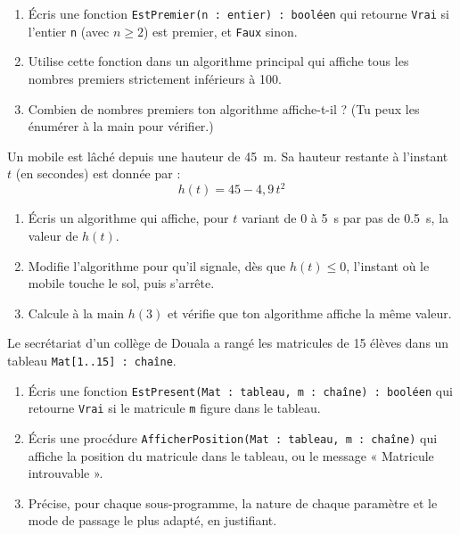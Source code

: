 \documentclass[11pt]{article}
\begin{document}
\begin{exercice}
\begin{enumerate}
  \item Écris une fonction \texttt{EstPremier(n : entier) : booléen} qui retourne \texttt{Vrai} si l'entier \texttt{n} (avec $n \geq 2$) est premier, et \texttt{Faux} sinon.
  \item Utilise cette fonction dans un algorithme principal qui affiche tous les nombres premiers strictement inférieurs à 100.
  \item Combien de nombres premiers ton algorithme affiche-t-il ? (Tu peux les énumérer à la main pour vérifier.)
\end{enumerate}
\end{exercice}

\begin{exercice}
Un mobile est lâché depuis une hauteur de \SI{45}{m}. Sa hauteur restante à l'instant $t$ (en secondes) est donnée par :
\[ h(t) = 45 - 4{,}9\,t^2 \]
\begin{enumerate}
  \item Écris un algorithme qui affiche, pour $t$ variant de 0 à \SI{5}{s} par pas de \SI{0,5}{s}, la valeur de $h(t)$.
  \item Modifie l'algorithme pour qu'il signale, dès que $h(t) \leq 0$, l'instant où le mobile touche le sol, puis s'arrête.
  \item Calcule à la main $h(3)$ et vérifie que ton algorithme affiche la même valeur.
\end{enumerate}
\end{exercice}

\begin{exercice}
Le secrétariat d'un collège de Douala a rangé les matricules de 15 élèves dans un tableau \texttt{Mat[1..15] : chaîne}.
\begin{enumerate}
  \item Écris une fonction \texttt{EstPresent(Mat : tableau, m : chaîne) : booléen} qui retourne \texttt{Vrai} si le matricule \texttt{m} figure dans le tableau.
  \item Écris une procédure \texttt{AfficherPosition(Mat : tableau, m : chaîne)} qui affiche la position du matricule dans le tableau, ou le message « Matricule introuvable ».
  \item Précise, pour chaque sous-programme, la nature de chaque paramètre et le mode de passage le plus adapté, en justifiant.
\end{enumerate}
\end{exercice}
\end{document}
